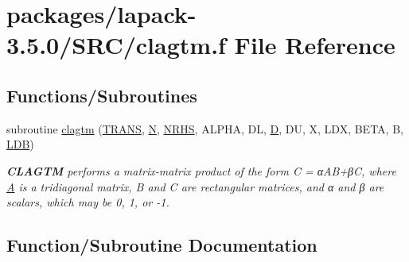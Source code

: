 \hypertarget{clagtm_8f}{}\section{packages/lapack-\/3.5.0/\+S\+R\+C/clagtm.f File Reference}
\label{clagtm_8f}
\subsection*{Functions/\+Subroutines}
\begin{DoxyCompactItemize}
\item 
subroutine \hyperlink{clagtm_8f_a3008440c0f918c3e32ccbcbd04ea5eb3}{clagtm} (\hyperlink{superlu__enum__consts_8h_a0c4e17b2d5cea33f9991ccc6a6678d62a1f61e3015bfe0f0c2c3fda4c5a0cdf58}{T\+R\+A\+N\+S}, \hyperlink{polmisc_8c_a0240ac851181b84ac374872dc5434ee4}{N}, \hyperlink{example__user_8c_aa0138da002ce2a90360df2f521eb3198}{N\+R\+H\+S}, A\+L\+P\+H\+A, D\+L, \hyperlink{odrpack_8h_a7dae6ea403d00f3687f24a874e67d139}{D}, D\+U, X, L\+D\+X, B\+E\+T\+A, B, \hyperlink{example__user_8c_a50e90a7104df172b5a89a06c47fcca04}{L\+D\+B})
\begin{DoxyCompactList}\small\item\em {\bfseries C\+L\+A\+G\+T\+M} performs a matrix-\/matrix product of the form C = α\+A\+B+β\+C, where \hyperlink{classA}{A} is a tridiagonal matrix, B and C are rectangular matrices, and α and β are scalars, which may be 0, 1, or -\/1. \end{DoxyCompactList}\end{DoxyCompactItemize}


\subsection{Function/\+Subroutine Documentation}
\hypertarget{clagtm_8f_a3008440c0f918c3e32ccbcbd04ea5eb3}{}
